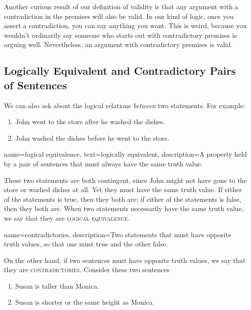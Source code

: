 Another curious result of our definition of validity is that any argument with a contradiction in the premises will also be valid. In our kind of logic, once you assert a contradiction, you can say anything you want. This is weird, because you wouldn't ordinarily say someone who starts out with contradictory premises is arguing well. Nevertheless, an argument with contradictory premises is valid.


\subsection{Logically Equivalent and Contradictory Pairs of Sentences}

We can also ask about the logical relations \emph{between} two statements. For example:

\begin{enumerate}[label=(\alph*)]
\item John went to the store after he washed the dishes.
\item John washed the dishes before he went to the store.
\end{enumerate}

{
name={logical equivalence},
text={logically equivalent},
description={A property held by a pair of sentences that must always have the same truth value.}
}

These two statements are both contingent, since John might not have gone to the store or washed dishes at all. Yet they must have the same truth value. If either of the statements is true, then they both are; if either of the statements is false, then they both are. When two statements necessarily have the same truth value, we say that they are \textsc{\gls{logical equivalence}}. \label{def:logical_equivalence}

{
name=contradictories,
description={Two statements that must have opposite truth values, so that one must true and the other false.}
}

On the other hand, if two sentences must have opposite truth values, we say that they are \textsc{\gls{contradictories}}. \label{def:contradictory}Consider these two sentences

\begin{enumerate}[label=(\alph*)]
\item Susan is taller than Monica.
\item Susan is shorter or the same height as Monica.
\end{enumerate}

